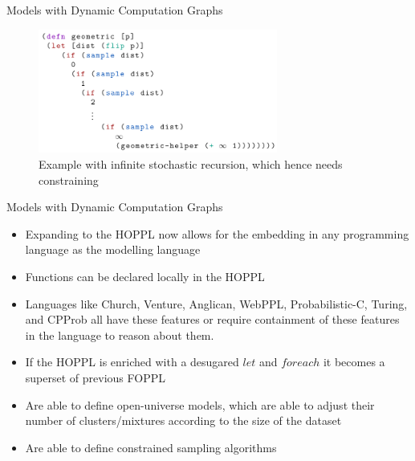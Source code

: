 \documentclass[AERbeamer%
              ,optEnglish%
              ,optBiber%
              ,optBibstyleAlphabetic%
              ,optBeamerClassicFormat%
              ]{AERlatex}%
\begin{document}
\begin{frame}[c]{Models with Dynamic Computation Graphs}
    \centering
    \begin{figure}
        \centering
        \includegraphics[width=0.7\textwidth]{InfiniteStochasticRecursion.png}
        \caption{Example with infinite stochastic recursion, which hence needs constraining}
    \end{figure}
\end{frame}


\begin{frame}[c]{Models with Dynamic Computation Graphs}
    \centering
    \begin{itemize}
        \item Expanding to the HOPPL now allows for the embedding in any programming language as the
              modelling language
        \item Functions can be declared locally in the HOPPL
        \item Languages like Church, Venture, Anglican, WebPPL, Probabilistic-C, Turing, and CPProb
              all have these features or require containment of these features in the language to reason
              about them.
        \item If the HOPPL is enriched with a desugared $let$ and $foreach$ it becomes a superset of
              previous FOPPL
        \item Are able to define open-universe models, which are able to adjust their number of clusters/mixtures
              according to the size of the dataset
        \item Are able to define constrained sampling algorithms
    \end{itemize}
\end{frame}
\end{document}
